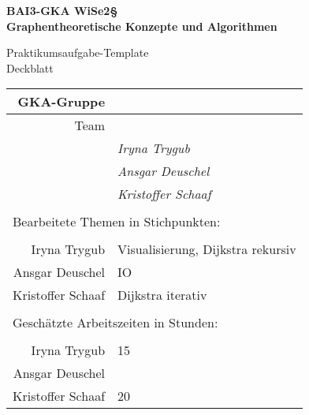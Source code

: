 

\thispagestyle{empty}
\begin{center}

    {\large {\bf   BAI3-GKA WiSe2§ \\ Graphentheoretische Konzepte und Algorithmen \\[5mm]} }
    
{\huge Praktikumsaufgabe-Template  \\[5mm] Deckblatt}\\

\end{center}

				\begin{tabular}[t]{|r|l|}
				 \hline
				GKA-Gruppe&                 \raisebox{-3mm}{\rule[8mm]{100mm}{0mm} }\\ \hline    
				Team &                                                        \\ \hline			
				& \textit{Iryna Trygub }               \\ \hline    
				& \textit{Ansgar Deuschel }               \\ \hline			
				& \textit{Kristoffer Schaaf }             \\ \hline  			
				\multicolumn{2}{c}{}\\  			
				\multicolumn{2}{l}{Bearbeitete Themen in Stichpunkten:}\\			
				\multicolumn{2}{c}{}\\  \hline
				Iryna Trygub & Visualisierung, Dijkstra rekursiv               \\ \hline    
				Ansgar Deuschel & IO                 \\ \hline			
				Kristoffer Schaaf & Dijkstra iterativ               \\ \hline 		
				\multicolumn{2}{c}{}\\  			
				\multicolumn{2}{l}{Geschätzte Arbeitszeiten in Stunden:}\\			
				\multicolumn{2}{c}{}\\  \hline
				Iryna Trygub & 15                \\ \hline    
				Ansgar Deuschel &                 \\ \hline			
				Kristoffer Schaaf & 20                \\ \hline 			
				\end{tabular}
~\\[4mm]
		
		
\vfill

